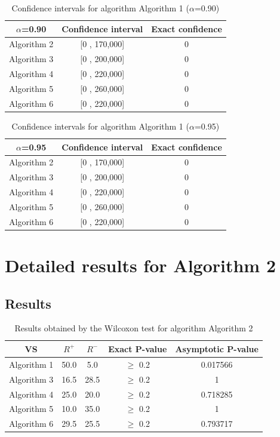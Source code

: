 \documentclass[a4paper,10pt]{article}
\begin{document}
\begin{table}[!htp]
\centering\small
\begin{tabular}{
|c|c|c|}
\hline
 $\alpha$=0.90 & Confidence interval & Exact confidence \\ \hline 
Algorithm 2 & [0 , 170,000] & 0\\ \hline 
Algorithm 3 & [0 , 200,000] & 0\\ \hline 
Algorithm 4 & [0 , 220,000] & 0\\ \hline 
Algorithm 5 & [0 , 260,000] & 0\\ \hline 
Algorithm 6 & [0 , 220,000] & 0\\ \hline 

\end{tabular}
\caption{Confidence intervals for algorithm Algorithm 1 ($\alpha$=0.90)}
\end{table}
\begin{table}[!htp]
\centering\small
\begin{tabular}{
|c|c|c|}
\hline
 $\alpha$=0.95 & Confidence interval & Exact confidence \\ \hline 
Algorithm 2 & [0 , 170,000] & 0\\ \hline 
Algorithm 3 & [0 , 200,000] & 0\\ \hline 
Algorithm 4 & [0 , 220,000] & 0\\ \hline 
Algorithm 5 & [0 , 260,000] & 0\\ \hline 
Algorithm 6 & [0 , 220,000] & 0\\ \hline 

\end{tabular}
\caption{Confidence intervals for algorithm Algorithm 1 ($\alpha$=0.95)}
\end{table}

 \clearpage 


\section{Detailed results for Algorithm 2}


\subsection{Results}

\begin{table}[!htp]
\centering\small
\begin{tabular}{
|c|c|c|c|c|}
\hline
 VS & $R^{+}$ & $R^{-}$ & Exact P-value & Asymptotic P-value \\ \hline 
Algorithm 1 & 50.0 & 5.0 & $\geq$ 0.2 & 0.017566\\ \hline 
Algorithm 3 & 16.5 & 28.5 & $\geq$ 0.2 & 1\\ \hline 
Algorithm 4 & 25.0 & 20.0 & $\geq$ 0.2 & 0.718285\\ \hline 
Algorithm 5 & 10.0 & 35.0 & $\geq$ 0.2 & 1\\ \hline 
Algorithm 6 & 29.5 & 25.5 & $\geq$ 0.2 & 0.793717\\ \hline 

\end{tabular}
\caption{Results obtained by the Wilcoxon test for algorithm Algorithm 2}
\end{table}
\end{document}
